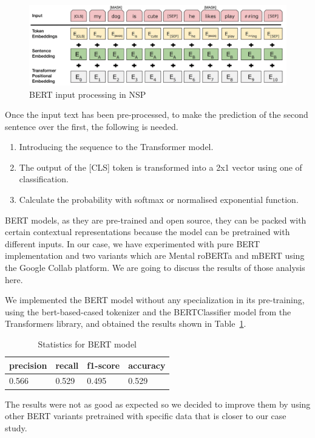 \begin{figure}[!htp]
    \centering
    \includegraphics[scale=0.35]{img/detection/BERTinput.png}
    \caption{BERT input processing in NSP}
    \label{fig:BERTinput}
\end{figure}
Once the input text has been pre-processed, to make the prediction of the second sentence over the first, the following is needed.

\begin{enumerate}
    \item Introducing the sequence to the Transformer model.
    \item The output of the [CLS] token is transformed into a 2x1 vector using one of classification.
    \item Calculate the probability with softmax or normalised exponential function.
\end{enumerate}

BERT models, as they are pre-trained and open source, they can be packed with certain contextual representations because the model can be pretrained with different inputs. In our case, we have experimented with pure BERT implementation and two variants which are Mental roBERTa and mBERT using the Google Collab platform. We are going to discuss the results of those analysis here.

We implemented the BERT model without any specialization in its pre-training, using the bert-based-cased tokenizer and the BERTClassifier model from the Transformers library, and obtained the results shown in Table~\ref{tab:BERTstatistics}.

\begin{table}[!htp]
\centering
\begin{tabular}{|l|l|l|l|}
\hline
precision & recall & f1-score  & accuracy \\ \hline
0.566      & 0.529   & 0.495      &  0.529 \\ \hline
\end{tabular}
\caption{Statistics for BERT model}
\label{tab:BERTstatistics}
\end{table}
The results were not as good as expected so we decided to improve them by using other BERT variants pretrained with specific data that is closer to our case study.

